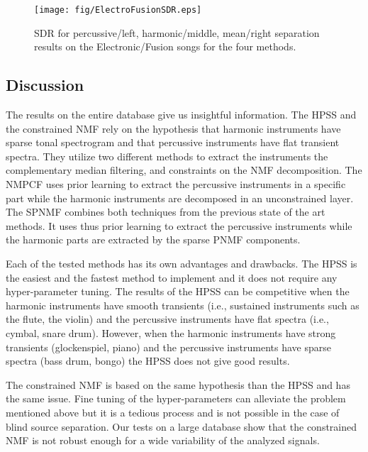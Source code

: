 \begin{figure}[htb]

  \centering 
  \texttt{[image: fig/ElectroFusionSDR.eps]}
  \caption{\label{ElectroFusionSDR} SDR for percussive/left, harmonic/middle, mean/right separation results on the Electronic/Fusion songs for the four methods.}
  
\end{figure}

\subsection{Discussion}
\label{discu}

The results on the entire database give us insightful information.
The HPSS and the constrained NMF rely on the hypothesis that harmonic instruments have sparse tonal spectrogram and that percussive instruments have flat transient spectra. They utilize two different methods to extract the instruments the complementary median filtering, and constraints on the NMF decomposition.
The NMPCF uses prior learning to extract the percussive instruments in a specific part while the harmonic instruments are decomposed in an unconstrained layer. 
The SPNMF combines both techniques from the previous state of the art methods. It uses thus prior learning to extract the percussive instruments while the harmonic parts are extracted by the sparse PNMF components.



Each of the tested methods has its own advantages and  drawbacks. The HPSS is the easiest and the fastest method to implement and it does not require any hyper-parameter tuning. The results of the HPSS can be competitive when the harmonic instruments have smooth transients (i.e., sustained instruments such as the flute, the violin) and the percussive instruments have flat spectra (i.e., cymbal, snare drum). However, when the harmonic instruments have strong transients (glockenspiel, piano) and the percussive instruments have sparse spectra (bass drum, bongo) the HPSS does not give good results. 

The constrained NMF is based on the same hypothesis than the HPSS and has the same issue. Fine tuning of the hyper-parameters can alleviate the problem mentioned above but it is a tedious process and is not possible in the case of blind source separation. Our tests on a large database show that the constrained NMF is not robust enough for a wide variability of the analyzed signals.

